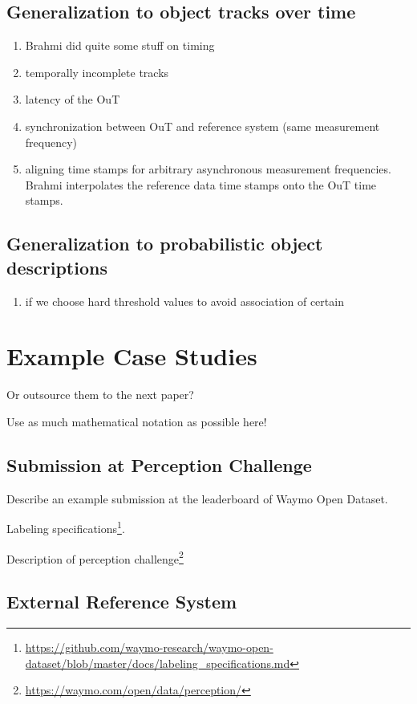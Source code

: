 \documentclass[conference]{IEEEtran}
\begin{document}
\subsection{Generalization to object tracks over time}
\begin{enumerate}
\item Brahmi \cite{Brahmi2020diss} did quite some stuff on timing
\item temporally incomplete tracks 
\item latency of the OuT
\item synchronization between OuT and reference system (same measurement frequency)
\item aligning time stamps for arbitrary asynchronous measurement frequencies. Brahmi \cite[Sec. 10.2.7]{Brahmi2020diss} interpolates the reference data time stamps onto the OuT time stamps.
\end{enumerate}


\subsection{Generalization to probabilistic object descriptions}
\begin{enumerate}
\item if we choose hard threshold values to avoid association of certain 
\end{enumerate}


\section{Example Case Studies}

Or outsource them to the next paper?

Use as much mathematical notation as possible here!

\subsection{Submission at Perception Challenge}

Describe an example submission at the leaderboard of Waymo Open Dataset. 

Labeling specifications\footnote{\url{https://github.com/waymo-research/waymo-open-dataset/blob/master/docs/labeling_specifications.md}}.

Description of perception challenge\footnote{\url{https://waymo.com/open/data/perception/}}


\subsection{External Reference System}
\end{document}
